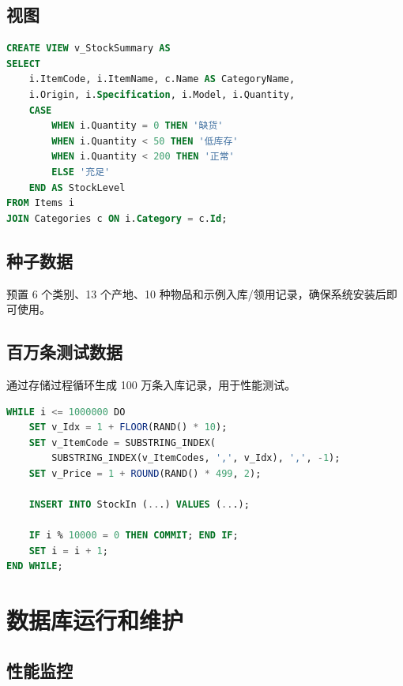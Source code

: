 \documentclass[12pt,a4paper]{ctexart}
\begin{document}
\subsection{视图}

\begin{lstlisting}[language=SQL,caption=库存汇总视图]
CREATE VIEW v_StockSummary AS
SELECT
    i.ItemCode, i.ItemName, c.Name AS CategoryName,
    i.Origin, i.Specification, i.Model, i.Quantity,
    CASE
        WHEN i.Quantity = 0 THEN '缺货'
        WHEN i.Quantity < 50 THEN '低库存'
        WHEN i.Quantity < 200 THEN '正常'
        ELSE '充足'
    END AS StockLevel
FROM Items i
JOIN Categories c ON i.Category = c.Id;
\end{lstlisting}

\subsection{种子数据}

预置 6 个类别、13 个产地、10 种物品和示例入库/领用记录，确保系统安装后即可使用。

\subsection{百万条测试数据}

通过存储过程循环生成 100 万条入库记录，用于性能测试。

\begin{lstlisting}[language=SQL,caption=百万条数据生成存储过程（核心循环）]
WHILE i <= 1000000 DO
    SET v_Idx = 1 + FLOOR(RAND() * 10);
    SET v_ItemCode = SUBSTRING_INDEX(
        SUBSTRING_INDEX(v_ItemCodes, ',', v_Idx), ',', -1);
    SET v_Price = 1 + ROUND(RAND() * 499, 2);

    INSERT INTO StockIn (...) VALUES (...);

    IF i % 10000 = 0 THEN COMMIT; END IF;
    SET i = i + 1;
END WHILE;
\end{lstlisting}

\section{数据库运行和维护}

\subsection{性能监控}
\end{document}
